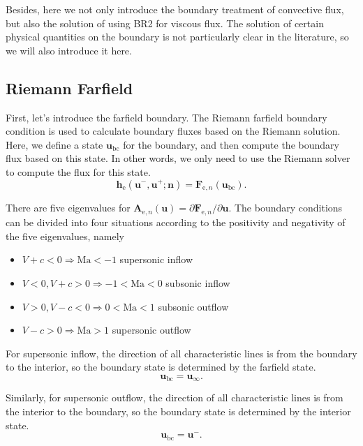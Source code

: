 \documentclass{develop-note}
\begin{document}
Besides, here we not only introduce the boundary treatment of convective flux, but also the solution of using BR2 for viscous flux. The solution of certain physical quantities on the boundary is not particularly clear in the literature, so we will also introduce it here.

\subsection*{Riemann Farfield}

First, let's introduce the farfield boundary. The Riemann farfield boundary condition is used to calculate boundary fluxes based on the Riemann solution. Here, we define a state $\mathbf{u}_{\mathrm{bc}}$ for the boundary, and then compute the boundary flux based on this state. In other words, we only need to use the Riemann solver to compute the flux for this state.
\begin{equation}
  \mathbf{h}_{\mathrm{e}}(\mathbf{u}^{-},\mathbf{u}^{+};\mathbf{n})=\mathbf{F}_{\mathrm{e},n}(\mathbf{u}_{\mathrm{bc}}).
\end{equation}

There are five eigenvalues for $\mathbf{A}_{\mathrm{e},n}(\mathbf{u})=\partial\mathbf{F}_{\mathrm{e},n}/\partial\mathbf{u}$. The boundary conditions can be divided into four situations according to the positivity and negativity of the five eigenvalues, namely
\begin{itemize}
  \item $V+c<0\Rightarrow \mathrm{Ma}<-1$ supersonic inflow
  \item $V<0,V+c>0\Rightarrow -1<\mathrm{Ma}<0$ subsonic inflow
  \item $V>0,V-c<0\Rightarrow 0<\mathrm{Ma}<1$ subsonic outflow
  \item $V-c>0\Rightarrow \mathrm{Ma}>1$ supersonic outflow
\end{itemize}

For supersonic inflow, the direction of all characteristic lines is from the boundary to the interior, so the boundary state is determined by the farfield state.
\begin{equation}
  \mathbf{u}_{\mathrm{bc}}=\mathbf{u}_{\infty}.
\end{equation}

Similarly, for supersonic outflow, the direction of all characteristic lines is from the interior to the boundary, so the boundary state is determined by the interior state.
\begin{equation}
  \mathbf{u}_{\mathrm{bc}}=\mathbf{u}^{-}.
\end{equation}
\end{document}
